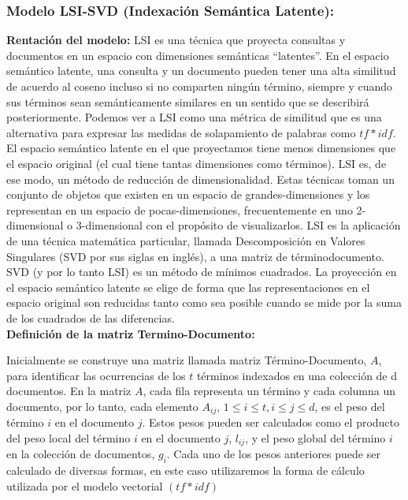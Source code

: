 \documentclass[runningheads]{llncs}
\begin{document}
\subsubsection*{Modelo LSI-SVD (Indexación Semántica Latente):}
\textbf{Rentación del modelo:}
LSI es una técnica que proyecta consultas y documentos en un espacio con dimensiones semánticas “latentes”. En el espacio semántico latente, una consulta y un documento pueden tener una alta similitud de acuerdo al coseno incluso si no comparten ningún término, siempre y cuando sus términos sean semánticamente similares en un sentido que se describirá posteriormente. Podemos ver a LSI como una métrica de similitud que es una alternativa para expresar las medidas de solapamiento de palabras como $tf*idf$. El espacio semántico latente en el que proyectamos tiene menos dimensiones que el espacio original (el cual tiene tantas dimensiones como términos). LSI es, de ese modo, un método de reducción de dimensionalidad. Estas técnicas toman un conjunto de objetos que existen en un espacio de grandes-dimensiones y los representan en un espacio de pocas-dimensiones, frecuentemente en uno 2-dimensional o 3-dimensional con el propósito de visualizarlos. LSI es la aplicación de una técnica matemática particular, llamada Descomposición en Valores Singulares (SVD por sus siglas en inglés), a una matriz de términodocumento. SVD (y por lo tanto LSI) es un método de mínimos cuadrados. La proyección en el espacio semántico latente se elige de forma que las representaciones en el espacio original son reducidas tanto como sea posible cuando se mide por la suma de los cuadrados de las diferencias.\\

\textbf{Definición de la matriz Termino-Documento:}

Inicialmente se construye una matriz llamada matriz Término-Documento, $A$, para identificar las ocurrencias de los $t$ términos indexados en una colección de d documentos. En la matriz $A$, cada fila representa un término y cada columna un documento, por lo tanto, cada elemento $A_{ij}$, $1 \le i \le t, i \le j  \le d$, es el peso del término $i$ en el documento $j$. Estos pesos pueden ser calculados como el producto del peso local del término $i$ en el documento $j$, $l_{ij}$, y el peso global del término $i$ en la colección de documentos, $g_i$. Cada uno de los pesos anteriores puede ser calculado de diversas formas, en este caso utilizaremos la forma de cálculo utilizada por el modelo vectorial $(tf*idf)$\\
\end{document}
